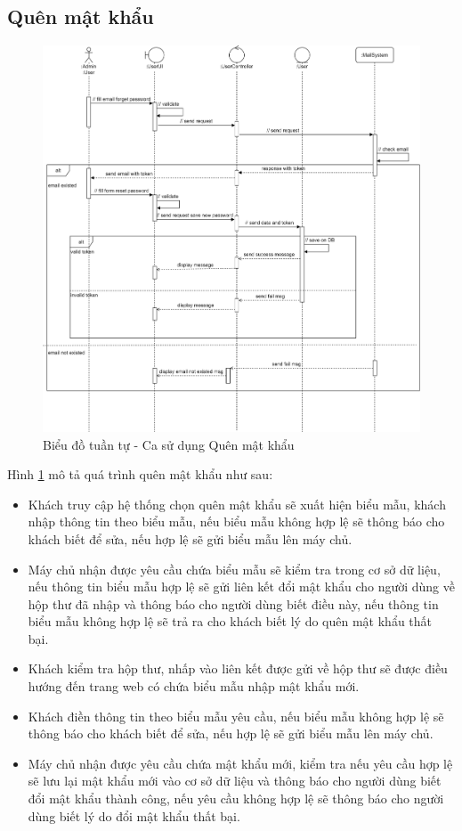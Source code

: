 \documentclass[./../main.tex]{subfiles}
\begin{document}
\subsection{Quên mật khẩu}
\begin{figure}[H]
	\centering
	\includegraphics[width=\linewidth]{./img/uc3.png}
	\caption{\label{tab:seq-uc3}Biểu đồ tuần tự - Ca sử dụng Quên mật khẩu}
\end{figure}
Hình \ref{tab:seq-uc3} mô tả quá trình quên mật khẩu như sau:
\begin{itemize}
    \item Khách truy cập hệ thống chọn quên mật khẩu sẽ xuất hiện biểu mẫu, khách nhập thông tin theo biểu mẫu, nếu biểu mẫu không hợp lệ sẽ thông báo cho khách biết để sửa, nếu hợp lệ sẽ gửi biểu mẫu lên máy chủ.
    \item Máy chủ nhận được yêu cầu chứa biểu mẫu sẽ kiểm tra trong cơ sở dữ liệu, nếu thông tin biểu mẫu hợp lệ sẽ gửi liên kết đổi mật khẩu cho người dùng về hộp thư đã nhập và thông báo cho người dùng biết điều này, nếu thông tin biểu mẫu không hợp lệ sẽ trả ra cho khách biết lý do quên mật khẩu thất bại.
    \item Khách kiểm tra hộp thư, nhấp vào liên kết được gửi về hộp thư sẽ được điều hướng đến trang web có chứa biểu mẫu nhập mật khẩu mới.
    \item Khách điền thông tin theo biểu mẫu yêu cầu, nếu biểu mẫu không hợp lệ sẽ thông báo cho khách biết để sửa, nếu hợp lệ sẽ gửi biểu mẫu lên máy chủ.
    \item Máy chủ nhận được yêu cầu chứa mật khẩu mới, kiểm tra nếu yêu cầu hợp lệ sẽ lưu lại mật khẩu mới vào cơ sở dữ liệu và thông báo cho người dùng biết đổi mật khẩu thành công, nếu yêu cầu không hợp lệ sẽ thông báo cho người dùng biết lý do đổi mật khẩu thất bại.
\end{itemize}
\end{document}
